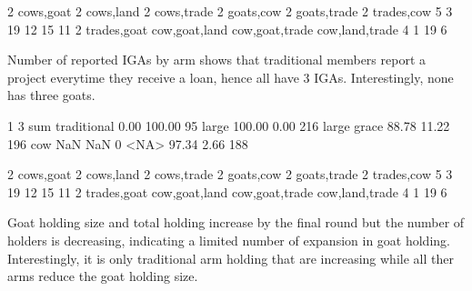 \begin{Schunk}
\begin{Soutput}

   2 cows,goat    2 cows,land   2 cows,trade    2 goats,cow  2 goats,trade   2 trades,cow 
             5              3             19             12             15             11 
 2 trades,goat  cow,goat,land cow,goat,trade cow,land,trade 
             4              1             19              6 
\end{Soutput}
\end{Schunk}
Number of reported IGAs by arm shows that \textsf{traditional} members report a project everytime they receive a loan, hence all have 3 IGAs. Interestingly, none has three goats.
\begin{Schunk}
\begin{Soutput}
                 1      3 sum
traditional   0.00 100.00  95
large       100.00   0.00 216
large grace  88.78  11.22 196
cow            NaN    NaN   0
<NA>         97.34   2.66 188
\end{Soutput}
\begin{Soutput}

   2 cows,goat    2 cows,land   2 cows,trade    2 goats,cow  2 goats,trade   2 trades,cow 
             5              3             19             12             15             11 
 2 trades,goat  cow,goat,land cow,goat,trade cow,land,trade 
             4              1             19              6 
\end{Soutput}
\end{Schunk}

Goat holding size and total holding increase by the final round but the number of holders is decreasing, indicating a limited number of expansion in goat holding. Interestingly, it is only \textsf{traditional} arm holding that are increasing while all ther arms reduce the goat holding size.

